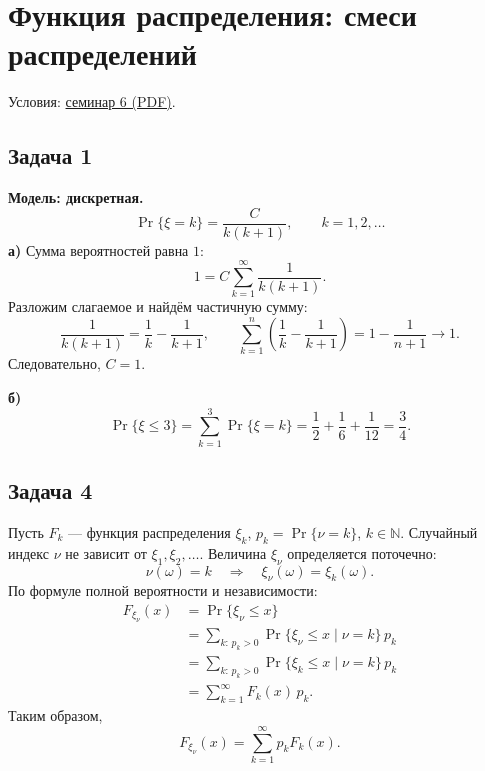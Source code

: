 \section{Функция распределения: смеси распределений}

\noindent Условия:
\href{run:conditions/sem_06.pdf}{семинар 6 (PDF)}.

\begingroup
\everymath{\textstyle}
\subsection{Задача 1}

\begin{solution}
    \textbf{Модель: дискретная.}
    \[
        \Pr\{\xi=k\}=\frac{C}{k(k+1)},\qquad k=1,2,\ldots
    \]
    \textbf{а)} Сумма вероятностей равна $1$:
    \[
        1=C\sum_{k=1}^{\infty}\frac1{k(k+1)}.
    \]
    Разложим слагаемое и найдём частичную сумму:
    \[
        \frac1{k(k+1)}=\frac1k-\frac1{k+1},\qquad
        \sum_{k=1}^{n}\left(\frac1k-\frac1{k+1}\right)
        =1-\frac1{n+1}\longrightarrow1.
    \]
    Следовательно, $\boxed{C=1}$.

    \medskip
    \textbf{б)}
    \[
        \Pr\{\xi\leq3\}
        =\sum_{k=1}^{3}\Pr\{\xi=k\}
        =\frac12+\frac16+\frac1{12}=\boxed{\frac34}.
    \]
\end{solution}

\subsection{Задача 4}

\begin{solution}
    Пусть $F_k$ --- функция распределения $\xi_k$,
    $p_k=\Pr\{\nu=k\}$, $k\in\mathbb N$.
    Случайный индекс $\nu$ не зависит от $\xi_1,\xi_2,\ldots$.
    Величина $\xi_\nu$ определяется поточечно:
    \[
        \nu(\omega)=k\quad\Longrightarrow\quad
        \xi_\nu(\omega)=\xi_k(\omega).
    \]
    По формуле полной вероятности и независимости:
    \[
        \begin{aligned}
            F_{\xi_\nu}(x)
            &=\Pr\{\xi_\nu\leq x\}\\
            &=\sum_{k:\,p_k>0}
                \Pr\{\xi_\nu\leq x\mid\nu=k\}\,p_k\\
            &=\sum_{k:\,p_k>0}
                \Pr\{\xi_k\leq x\mid\nu=k\}\,p_k\\
            &=\sum_{k=1}^{\infty}F_k(x)\,p_k.
        \end{aligned}
    \]
    Таким образом,
    \[
        \boxed{F_{\xi_\nu}(x)=\sum_{k=1}^{\infty}p_kF_k(x).}
    \]
\end{solution}

